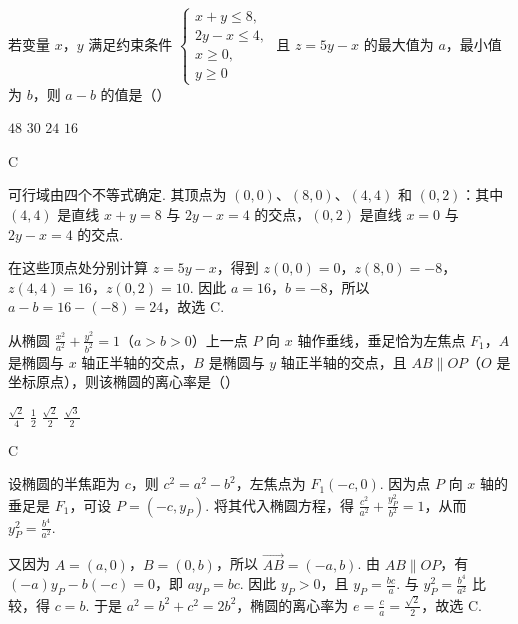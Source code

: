 \begin{problem}
若变量 \(x\)，\(y\) 满足约束条件 \(\begin{cases}
x+y\leqslant8,\\
2y-x\leqslant4,\\
x\geqslant0,\\
y\geqslant0
\end{cases}\) 且 \(z=5y-x\) 的最大值为 \(a\)，最小值为 \(b\)，则 \(a-b\) 的值是（\quad）

\choices
    {\(48\)}
    {\(30\)}
    {\(24\)}
    {\(16\)}
\end{problem}

\begin{answer}
C
\end{answer}

\begin{solution}
可行域由四个不等式确定. 其顶点为 \((0,0)\)、\((8,0)\)、\((4,4)\) 和 \((0,2)\)：其中 \((4,4)\) 是直线 \(x+y=8\) 与 \(2y-x=4\) 的交点，\((0,2)\) 是直线 \(x=0\) 与 \(2y-x=4\) 的交点.

在这些顶点处分别计算 \(z=5y-x\)，得到
\(z(0,0)=0\)，\(z(8,0)=-8\)，\(z(4,4)=16\)，\(z(0,2)=10\). 因此 \(a=16\)，\(b=-8\)，所以 \(a-b=16-(-8)=24\)，故选 C.
\end{solution}

\begin{problem}
从椭圆 \(\frac{x^2}{a^2}+\frac{y^2}{b^2}=1\)（\(a>b>0\)）上一点 \(P\) 向 \(x\) 轴作垂线，垂足恰为左焦点 \(F_1\)，\(A\) 是椭圆与 \(x\) 轴正半轴的交点，\(B\) 是椭圆与 \(y\) 轴正半轴的交点，且 \(AB \parallel OP\)（\(O\) 是坐标原点），则该椭圆的离心率是（\quad）

\choices
    {\(\frac{\sqrt{2}}{4}\)}
    {\(\frac{1}{2}\)}
    {\(\frac{\sqrt{2}}{2}\)}
    {\(\frac{\sqrt{3}}{2}\)}
\end{problem}

\begin{answer}
C
\end{answer}

\begin{solution}
设椭圆的半焦距为 \(c\)，则 \(c^2=a^2-b^2\)，左焦点为 \(F_1(-c,0)\). 因为点 \(P\) 向 \(x\) 轴的垂足是 \(F_1\)，可设 \(P=(-c,y_P)\). 将其代入椭圆方程，得
\(\frac{c^2}{a^2}+\frac{y_P^2}{b^2}=1\)，从而 \(y_P^2=\frac{b^4}{a^2}\).

又因为 \(A=(a,0)\)，\(B=(0,b)\)，所以 \(\overrightarrow{AB}=(-a,b)\). 由 \(AB\parallel OP\)，有
\((-a)y_P-b(-c)=0\)，即 \(ay_P=bc\). 因此 \(y_P>0\)，且 \(y_P=\frac{bc}{a}\). 与 \(y_P^2=\frac{b^4}{a^2}\) 比较，得 \(c=b\). 于是 \(a^2=b^2+c^2=2b^2\)，椭圆的离心率为 \(e=\frac ca=\frac{\sqrt{2}}{2}\)，故选 C.
\end{solution}

